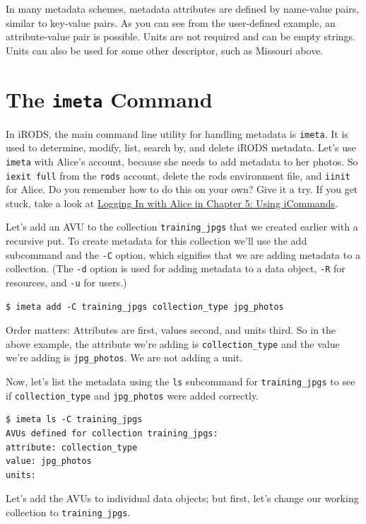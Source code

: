 \documentclass[10pt,oneside]{memoir}
\begin{document}
In many metadata schemes, metadata attributes are defined by name-value pairs, similar to key-value pairs. As you can see from the user-defined example, an attribute-value pair is possible. Units are not required and can be empty strings. Units can also be used for some other descriptor, such as Missouri above.

\section{The \texttt{imeta} Command}
In iRODS, the main command line utility for handling metadata is \texttt{imeta}. It is used to determine, modify, list, search by, and delete iRODS metadata. Let's use \texttt{imeta} with Alice's account, because she needs to add metadata to her photos. So \texttt{iexit full} from the \texttt{rods} account, delete the rods environment file, and \texttt{iinit} for Alice. Do you remember how to do this on your own? Give it a try. If you get stuck, take a look at \hyperref[sec:logging_in_with_alice]{Logging In with Alice in Chapter 5: Using iCommands}.

Let's add an AVU to the collection \texttt{training\_jpgs} that we created earlier with a recursive put. To create metadata for this collection we'll use the add subcommand and the \texttt{-C} option, which signifies that we are adding metadata to a collection. (The \texttt{-d} option is used for adding metadata to a data object, \texttt{-R} for resources, and \texttt{-u} for users.)

\begin{lstlisting}
$ imeta add -C training_jpgs collection_type jpg_photos
\end{lstlisting}

Order matters: Attributes are first, values second, and units third. So in the above example, the attribute we're adding is \texttt{collection\_type} and the value we're adding is \texttt{jpg\_photos}. We are not adding a unit.

Now, let's list the metadata using the \texttt{ls} subcommand for \texttt{training\_jpgs} to see if \texttt{collection\_type} and \texttt{jpg\_photos} were added correctly.

\begin{lstlisting}
$ imeta ls -C training_jpgs
AVUs defined for collection training_jpgs:
attribute: collection_type
value: jpg_photos
units:
\end{lstlisting}

Let's add the AVUs to individual data objects; but first, let's change our working collection to \texttt{training\_jpgs}.
\end{document}

